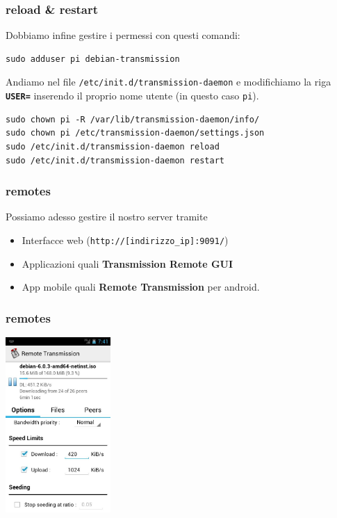 \documentclass[xcolor=svgnames,11pt]{beamer}
\begin{document}
\begin{frame}[fragile]\frametitle{reload \& restart}
Dobbiamo infine gestire i permessi con questi comandi:
\begin{block}{}
\begin{verbatim}
sudo adduser pi debian-transmission
\end{verbatim}
\end{block}
\medskip
Andiamo nel file \texttt{/etc/init.d/transmission-daemon} e modifichiamo la riga \texttt{\textbf{USER=}} inserendo il proprio nome utente (in questo caso \texttt{pi}).
\medskip
\begin{block}{}
\begin{small}
\begin{verbatim}
sudo chown pi -R /var/lib/transmission-daemon/info/
sudo chown pi /etc/transmission-daemon/settings.json
sudo /etc/init.d/transmission-daemon reload
sudo /etc/init.d/transmission-daemon restart
\end{verbatim}
\end{small}
\end{block}
\end{frame}

\begin{frame}\frametitle{remotes}
Possiamo adesso gestire il nostro server tramite
\begin{itemize}
  \item Interfacce web (\texttt{http://[indirizzo\_ip]:9091/})
  \item Applicazioni quali \textbf{Transmission Remote GUI}
  \item App mobile quali \textbf{Remote Transmission} per android.
\end{itemize}
\end{frame}

\begin{frame}\frametitle{remotes}
\begin{center}
\includegraphics[width=4cm]{remote-android.jpg}
\end{center}
\end{frame}
\end{document}
